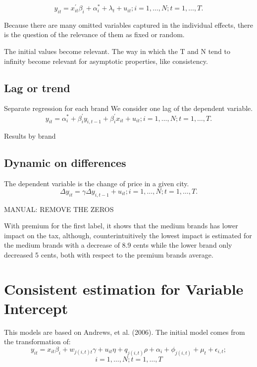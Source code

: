 \documentclass[]{article}
\begin{document}
\begin{equation*}
	y_{it} = x_{it}^{'} \beta_{i} + \alpha_{i}^{*} + \lambda_{t} + u_{it}; i = 1,\ldots,N; t=1,\ldots,T.
\end{equation*}

Because there are many omitted variables captured in the individual effects, there is the question of the relevance of them as fixed or random.

The initial values become relevant.
The way in which the T and N tend to infinity become relevant for asymptotic properties, like consistency.



\subsection{Lag or trend }
Separate regression for each brand
We consider one lag of the dependent variable.
\begin{equation*}
	y_{it} = \alpha_{i}^{*} + \beta_{i}^{'}y_{i,t-1}  + \beta_{i}^{'}x_{it} + u_{it}; i = 1,\ldots,N; t=1,\ldots,T.
\end{equation*}

Results by brand

\begin{landscape}
	
\end{landscape}

\subsection{Dynamic on differences}
The dependent variable is the change of price in a given city. 
\begin{equation*}
	\Delta y_{it} = \gamma \Delta y_{i,t-1} + u_{it}; i = 1,\ldots,N; t=1,\ldots,T.
\end{equation*}



MANUAL: REMOVE THE ZEROS 

With premium for the first label, it shows that the medium brands has lower impact on the tax, although, counterintuitively the lowest impact is estimated for the medium brands with a decrease of 8.9 cents while the lower brand only decreased 5 cents, both with respect to the premium brands average. 

 
\section{Consistent estimation for Variable Intercept}
This models are based on Andrews, et al. (2006). The initial model comes from the transformation of:
\begin{equation*}
	y_{it} = x_{it} \beta_{i} + w_{j(i,t)t} \gamma + u_{it} \eta + q_{j(i,t)} \rho + \alpha_{i}  + \phi_{j(i,t)} + \mu_{t} + \epsilon_{i,t}; 
\end{equation*}
$$i = 1,\ldots,N; t=1,\ldots,T$$
\end{document}
